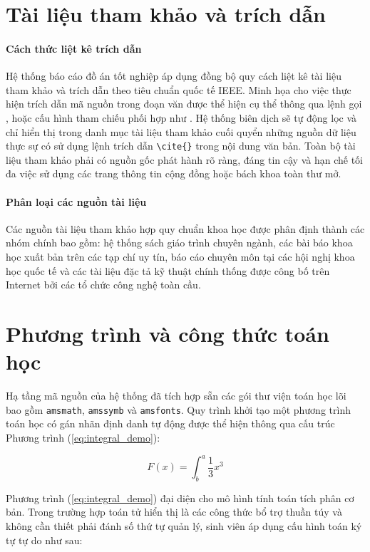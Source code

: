 \documentclass[../DoAn.tex]{subfiles}
\begin{document}
\section{Tài liệu tham khảo và trích dẫn}
\paragraph{Cách thức liệt kê trích dẫn}\mbox{}

Hệ thống báo cáo đồ án tốt nghiệp áp dụng đồng bộ quy cách liệt kê tài liệu tham khảo và trích dẫn theo tiêu chuẩn quốc tế IEEE. Minh họa cho việc thực hiện trích dẫn mã nguồn trong đoạn văn được thể hiện cụ thể thông qua lệnh gọi \cite{scott2013sdn}, hoặc cấu hình tham chiếu phối hợp như \cite{ashton2009internet}. Hệ thống biên dịch sẽ tự động lọc và chỉ hiển thị trong danh mục tài liệu tham khảo cuối quyển những nguồn dữ liệu thực sự có sử dụng lệnh trích dẫn \texttt{\textbackslash cite\{\}} trong nội dung văn bản. Toàn bộ tài liệu tham khảo phải có nguồn gốc phát hành rõ ràng, đáng tin cậy và hạn chế tối đa việc sử dụng các trang thông tin cộng đồng hoặc bách khoa toàn thư mở.

\paragraph{Phân loại các nguồn tài liệu}\mbox{}

Các nguồn tài liệu tham khảo hợp quy chuẩn khoa học được phân định thành các nhóm chính bao gồm: hệ thống sách giáo trình chuyên ngành, các bài báo khoa học xuất bản trên các tạp chí uy tín, báo cáo chuyên môn tại các hội nghị khoa học quốc tế và các tài liệu đặc tả kỹ thuật chính thống được công bố trên Internet bởi các tổ chức công nghệ toàn cầu.

\section{Phương trình và công thức toán học}
Hạ tầng mã nguồn của hệ thống đã tích hợp sẵn các gói thư viện toán học lõi bao gồm \texttt{amsmath}, \texttt{amssymb} và \texttt{amsfonts}. Quy trình khởi tạo một phương trình toán học có gán nhãn định danh tự động được thể hiện thông qua cấu trúc Phương trình (\ref{eq:integral_demo}):

\begin{equation}\label{eq:integral_demo}
    F(x) = \int^a_b \frac{1}{3}x^3
\end{equation}

Phương trình (\ref{eq:integral_demo}) đại diện cho mô hình tính toán tích phân cơ bản. Trong trường hợp toán tử hiển thị là các công thức bổ trợ thuần túy và không cần thiết phải đánh số thứ tự quản lý, sinh viên áp dụng cấu hình toán ký tự tự do như sau:
\end{document}
